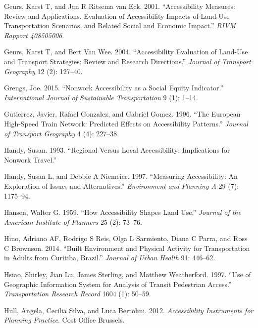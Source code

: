 \documentclass[preprint, 3p,
authoryear]{elsarticle} %
\newlength{\cslhangindent}
\newlength{\cslentryspacingunit} %
\newenvironment{CSLReferences}[2] %
 {%
  \setlength{\parindent}{0pt}
  \ifodd #1
  \let\oldpar\par
  \def\par{\hangindent=\cslhangindent\oldpar}
  \fi
  \setlength{\parskip}{#2\cslentryspacingunit}
 }%
 {}
\begin{document}
\begin{CSLReferences}{1}{0}
\leavevmode{}%
Geurs, Karst T, and Jan R Ritsema van Eck. 2001. {``Accessibility
Measures: Review and Applications. Evaluation of Accessibility Impacts
of Land-Use Transportation Scenarios, and Related Social and Economic
Impact.''} \emph{RIVM Rapport 408505006}.

\leavevmode{}%
Geurs, Karst T, and Bert Van Wee. 2004. {``Accessibility Evaluation of
Land-Use and Transport Strategies: Review and Research Directions.''}
\emph{Journal of Transport Geography} 12 (2): 127--40.

\leavevmode{}%
Grengs, Joe. 2015. {``Nonwork Accessibility as a Social Equity
Indicator.''} \emph{International Journal of Sustainable Transportation}
9 (1): 1--14.

\leavevmode{}%
Gutierrez, Javier, Rafael Gonzalez, and Gabriel Gomez. 1996. {``The
European High-Speed Train Network: Predicted Effects on Accessibility
Patterns.''} \emph{Journal of Transport Geography} 4 (4): 227--38.

\leavevmode{}%
Handy, Susan. 1993. {``Regional Versus Local Accessibility: Implications
for Nonwork Travel.''}

\leavevmode{}%
Handy, Susan L, and Debbie A Niemeier. 1997. {``Measuring Accessibility:
An Exploration of Issues and Alternatives.''} \emph{Environment and
Planning A} 29 (7): 1175--94.

\leavevmode{}%
Hansen, Walter G. 1959. {``How Accessibility Shapes Land Use.''}
\emph{Journal of the American Institute of Planners} 25 (2): 73--76.

\leavevmode{}%
Hino, Adriano AF, Rodrigo S Reis, Olga L Sarmiento, Diana C Parra, and
Ross C Brownson. 2014. {``Built Environment and Physical Activity for
Transportation in Adults from Curitiba, Brazil.''} \emph{Journal of
Urban Health} 91: 446--62.

\leavevmode{}%
Hsiao, Shirley, Jian Lu, James Sterling, and Matthew Weatherford. 1997.
{``Use of Geographic Information System for Analysis of Transit
Pedestrian Access.''} \emph{Transportation Research Record} 1604 (1):
50--59.

\leavevmode{}%
Hull, Angela, Cecilia Silva, and Luca Bertolini. 2012.
\emph{Accessibility Instruments for Planning Practice}. Cost Office
Brussels.


\end{CSLReferences}
\end{document}
